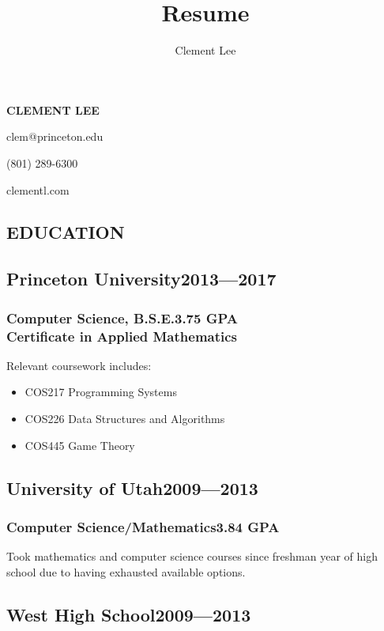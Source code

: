 \documentclass[11pt]{article}
\author{Clement Lee}
\title{Resume}
\begin{document}
\vspace*{1.5em}

{\huge\textbf{CLEMENT LEE}}
\vspace{0.25\baselineskip}

clem@princeton.edu

(801) 289-6300

clementl.com

\vspace{\baselineskip}
\begin{multicols}{2}
\section*{EDUCATION}
\subsection*{Princeton University\hfill\textnormal{2013---2017}}
\subsubsection*{Computer Science, B.S.E.\hfill\textnormal{3.75 GPA}\\
Certificate in Applied Mathematics}

Relevant coursework includes:
\begin{itemize}[noitemsep,nolistsep,leftmargin=*]
\item COS217 Programming Systems
\item COS226 Data Structures and Algorithms
\item COS445 Game Theory
\end{itemize}

\subsection*{University of Utah\hfill\textnormal{2009---2013}}
\subsubsection*{Computer Science/Mathematics\hfill\textnormal{3.84 GPA}}
Took mathematics and computer science courses since freshman year of high school due to having exhausted available options.

\subsection*{West High School\hfill\textnormal{2009---2013}}

\end{multicols}
\end{document}
